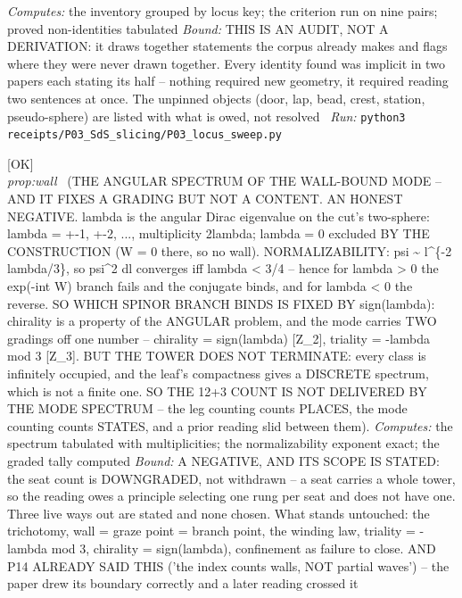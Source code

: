\begin{description}
\emph{Computes:} the inventory grouped by locus key; the criterion run on nine pairs; proved non-identities tabulated
 \emph{Bound:} THIS IS AN AUDIT, NOT A DERIVATION: it draws together statements the corpus already makes and flags where they were never drawn together. Every identity found was implicit in two papers each stating its half -- nothing required new geometry, it required reading two sentences at once. The unpinned objects (door, lap, bead, crest, station, pseudo-sphere) are listed with what is owed, not resolved
\ \emph{Run:} \texttt{python3 receipts/P03\_SdS\_slicing/P03\_locus\_sweep.py}
\item[\label{rcpt:P14_lambda_spectrum}\texttt{P14\_lambda\_spectrum}]\hfill\textsf{[OK]}\\
\textit{prop:wall} \ (THE ANGULAR SPECTRUM OF THE WALL-BOUND MODE -- AND IT FIXES A GRADING BUT NOT A CONTENT. AN HONEST NEGATIVE. lambda is the angular Dirac eigenvalue on the cut's two-sphere: lambda = +-1, +-2, ..., multiplicity 2\textbar{}lambda\textbar{}; lambda = 0 excluded BY THE CONSTRUCTION (W = 0 there, so no wall). NORMALIZABILITY: psi \textasciitilde{} l\textasciicircum{}\{-2 lambda/3\}, so \textbar{}psi\textbar{}\textasciicircum{}2 dl converges iff lambda < 3/4 -- hence for lambda > 0 the exp(-int W) branch fails and the conjugate binds, and for lambda < 0 the reverse. SO WHICH SPINOR BRANCH BINDS IS FIXED BY sign(lambda): chirality is a property of the ANGULAR problem, and the mode carries TWO gradings off one number -- chirality = sign(lambda) [Z\_2], triality = -lambda mod 3 [Z\_3]. BUT THE TOWER DOES NOT TERMINATE: every class is infinitely occupied, and the leaf's compactness gives a DISCRETE spectrum, which is not a finite one. SO THE 12+3 COUNT IS NOT DELIVERED BY THE MODE SPECTRUM -- the leg counting counts PLACES, the mode counting counts STATES, and a prior reading slid between them). 
\emph{Computes:} the spectrum tabulated with multiplicities; the normalizability exponent exact; the graded tally computed
 \emph{Bound:} A NEGATIVE, AND ITS SCOPE IS STATED: the seat count is DOWNGRADED, not withdrawn -- a seat carries a whole tower, so the reading owes a principle selecting one rung per seat and does not have one. Three live ways out are stated and none chosen. What stands untouched: the trichotomy, wall = graze point = branch point, the winding law, triality = -lambda mod 3, chirality = sign(lambda), confinement as failure to close. AND P14 ALREADY SAID THIS ('the index counts walls, NOT partial waves') -- the paper drew its boundary correctly and a later reading crossed it

\end{description}
